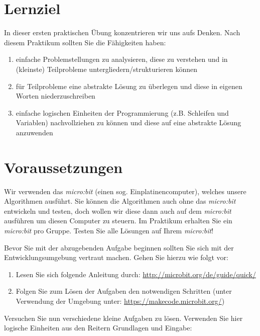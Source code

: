 \documentclass{hmLab}
\subtitle{Kontrollstrukturen mit dem micro:bit}
\author{Prof.\,Dr.-Ing.\,Martin Hobelsberger\\Dr.\,Benedikt Zönnchen\\Prof.\,Dr.-Ing.\,Benedikt Dietrich}
\begin{document}
\maketitle

\section*{Lernziel}

In dieser ersten praktischen Übung konzentrieren wir uns aufs Denken.
Nach diesem Praktikum sollten Sie die Fähigkeiten haben:

\begin{enumerate}[label=$\bullet$]
	\item einfache Problemstellungen zu analysieren, diese zu verstehen und in (kleinste) Teilprobleme untergliedern/strukturieren können 
	\item für Teilprobleme eine abstrakte Lösung zu überlegen und diese in eigenen Worten niederzuschreiben 
	\item einfache logischen Einheiten der Programmierung (z.B. Schleifen und Variablen) nachvollziehen zu können und diese auf eine abstrakte Lösung anzuwenden
\end{enumerate}

\section*{Voraussetzungen}

Wir verwenden das \textit{micro:bit} (einen sog. Einplatinencomputer), welches unsere Algorithmen ausführt.
Sie können die Algorithmen auch ohne das \textit{micro:bit} entwickeln und testen, doch wollen wir diese dann auch auf dem \textit{micro:bit} ausführen um diesen Computer zu steuern.
Im Praktikum erhalten Sie ein \textit{micro:bit} pro Gruppe.
Testen Sie alle Lösungen auf Ihrem \textit{micro:bit}!

\newpage


Bevor Sie mit der abzugebenden Aufgabe beginnen sollten Sie sich mit der Entwicklungsumgebung vertraut machen. 
Gehen Sie hierzu wie folgt vor:

\begin{enumerate}[label=(\arabic*)]
	\item Lesen Sie sich folgende Anleitung durch: \href{http://microbit.org/de/guide/quick/}{http://microbit.org/de/guide/quick/}
	\item Folgen Sie zum Lösen der Aufgaben den notwendigen Schritten (unter Verwendung der Umgebung unter: \href{https://makecode.microbit.org/}{https://makecode.microbit.org/})
\end{enumerate}
%
Versuchen Sie nun verschiedene kleine Aufgaben zu lösen.
Verwenden Sie hier logische Einheiten aus den Reitern Grundlagen und Eingabe:
\end{document}
